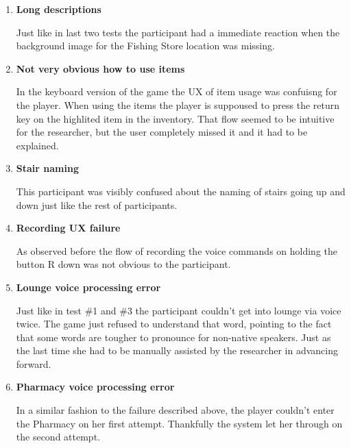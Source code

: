 \begin{enumerate}
    \item \textbf{Long descriptions}
    
    Just like in last two tests the participant had a immediate reaction when the background image for the Fishing Store location was missing.


    \item \textbf{Not very obvious how to use items}
    
    In the keyboard version of the game the UX of item usage was confuisng for the player. When using the items the player is suppoused to press the return key on the highlited item in the inventory. That flow seemed to be intuitive for the researcher, but the user completely missed it and it had to be explained.







    \item \textbf{Stair naming}
    
    This participant was visibly confused about the naming of stairs going up and down just like the rest of participants.


    \item \textbf{Recording UX failure}
    
    As observed before the flow of recording the voice commands on holding the button R down was not obvious to the participant.



    

    \item \textbf{Lounge voice processing error}
    
   Just like in test \#1 and \#3 the participant couldn't get into lounge via voice twice. The game just refused to understand that word, pointing to the fact that some words are tougher to pronounce for non-native speakers. Just as the last time she had to be manually assisted by the researcher in advancing forward.

    \item \textbf{Pharmacy voice processing error}
    
    In a similar fashion to the failure described above, the player couldn't enter the Pharmacy on her first attempt. Thankfully the system let her through on the second attempt.

\end{enumerate}




